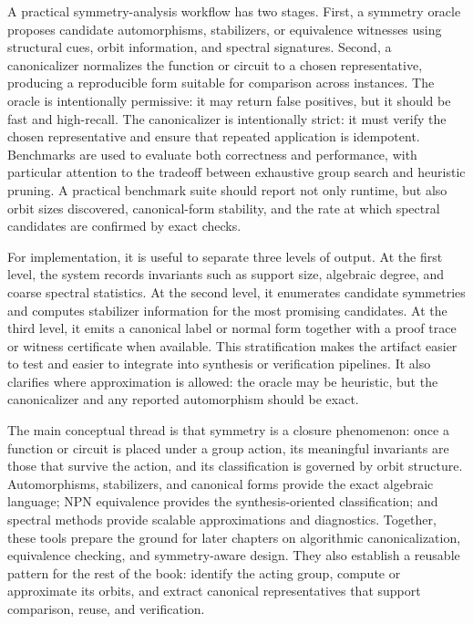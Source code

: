 \documentclass[11pt]{article}
\begin{document}
A practical symmetry-analysis workflow has two stages. First, a symmetry oracle proposes candidate automorphisms, stabilizers, or equivalence witnesses using structural cues, orbit information, and spectral signatures. Second, a canonicalizer normalizes the function or circuit to a chosen representative, producing a reproducible form suitable for comparison across instances. The oracle is intentionally permissive: it may return false positives, but it should be fast and high-recall. The canonicalizer is intentionally strict: it must verify the chosen representative and ensure that repeated application is idempotent. Benchmarks are used to evaluate both correctness and performance, with particular attention to the tradeoff between exhaustive group search and heuristic pruning. A practical benchmark suite should report not only runtime, but also orbit sizes discovered, canonical-form stability, and the rate at which spectral candidates are confirmed by exact checks.

For implementation, it is useful to separate three levels of output. At the first level, the system records invariants such as support size, algebraic degree, and coarse spectral statistics. At the second level, it enumerates candidate symmetries and computes stabilizer information for the most promising candidates. At the third level, it emits a canonical label or normal form together with a proof trace or witness certificate when available. This stratification makes the artifact easier to test and easier to integrate into synthesis or verification pipelines. It also clarifies where approximation is allowed: the oracle may be heuristic, but the canonicalizer and any reported automorphism should be exact.

The main conceptual thread is that symmetry is a closure phenomenon: once a function or circuit is placed under a group action, its meaningful invariants are those that survive the action, and its classification is governed by orbit structure. Automorphisms, stabilizers, and canonical forms provide the exact algebraic language; NPN equivalence provides the synthesis-oriented classification; and spectral methods provide scalable approximations and diagnostics. Together, these tools prepare the ground for later chapters on algorithmic canonicalization, equivalence checking, and symmetry-aware design. They also establish a reusable pattern for the rest of the book: identify the acting group, compute or approximate its orbits, and extract canonical representatives that support comparison, reuse, and verification.
\end{document}
